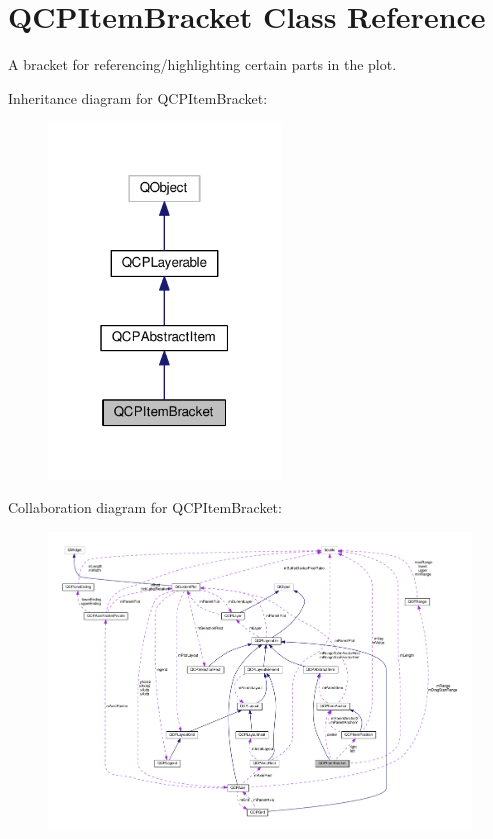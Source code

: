 \hypertarget{classQCPItemBracket}{}\section{Q\+C\+P\+Item\+Bracket Class Reference}
\label{classQCPItemBracket}


A bracket for referencing/highlighting certain parts in the plot.  




Inheritance diagram for Q\+C\+P\+Item\+Bracket\+:
\nopagebreak
\begin{figure}[H]
\begin{center}
\leavevmode
\includegraphics[width=175pt]{classQCPItemBracket__inherit__graph}
\end{center}
\end{figure}


Collaboration diagram for Q\+C\+P\+Item\+Bracket\+:
\nopagebreak
\begin{figure}[H]
\begin{center}
\leavevmode
\includegraphics[width=350pt]{classQCPItemBracket__coll__graph}
\end{center}
\end{figure}
